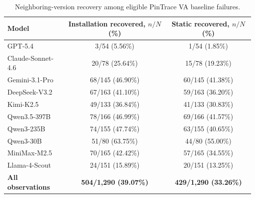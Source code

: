 \begin{table}[t]
\caption{Neighboring-version recovery among eligible PinTrace VA baseline failures.}
\label{tab:neighbor_recovery}
\begin{tabular}{lcc}
\toprule
Model & Installation recovered, $n/N$ (\%) & Static recovered, $n/N$ (\%) \\
\midrule
GPT-5.4 & 3/54 (5.56\%) & 1/54 (1.85\%) \\
Claude-Sonnet-4.6 & 20/78 (25.64\%) & 15/78 (19.23\%) \\
Gemini-3.1-Pro & 68/145 (46.90\%) & 60/145 (41.38\%) \\
DeepSeek-V3.2 & 67/163 (41.10\%) & 59/163 (36.20\%) \\
Kimi-K2.5 & 49/133 (36.84\%) & 41/133 (30.83\%) \\
Qwen3.5-397B & 78/166 (46.99\%) & 69/166 (41.57\%) \\
Qwen3-235B & 74/155 (47.74\%) & 63/155 (40.65\%) \\
Qwen3-30B & 51/80 (63.75\%) & 44/80 (55.00\%) \\
MiniMax-M2.5 & 70/165 (42.42\%) & 57/165 (34.55\%) \\
Llama-4-Scout & 24/151 (15.89\%) & 20/151 (13.25\%) \\
\midrule
\textbf{All observations} & \textbf{504/1,290 (39.07\%)} & \textbf{429/1,290 (33.26\%)} \\
\bottomrule
\end{tabular}
\end{table}
